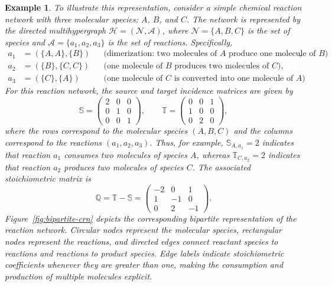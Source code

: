 \documentclass[a4paper,11pt,reqno]{amsart}
\newtheorem{example}[definition]{Example}
\begin{document}
\begin{example}
To illustrate this representation, consider a simple chemical reaction network
with three molecular species:
$A$, $B$, and $C$. The network is represented by the directed multihypergraph
$\mathcal{H}=(\mathcal{N},\mathcal{A})$, where
$\mathcal{N}=\{A,B,C\}$ is the set of species and
$\mathcal{A}=\{a_1,a_2,a_3\}$ is the set of reactions. Specifically,
\begin{align*}
a_1 &= (\{A,A\},\{B\})
&& \text{(dimerization: two molecules of $A$ produce one molecule of $B$)},\\
a_2 &= (\{B\},\{C,C\})
&& \text{(one molecule of $B$ produces two molecules of $C$)},\\
a_3 &= (\{C\},\{A\})
&& \text{(one molecule of $C$ is converted into one molecule of $A$)}.
\end{align*}
For this reaction network, the source and target incidence matrices are
given by
$$
\mathbb{S}=
\begin{pmatrix}
2 & 0 & 0\\
0 & 1 & 0\\
0 & 0 & 1
\end{pmatrix},
\qquad
\mathbb{T}=
\begin{pmatrix}
0 & 0 & 1\\
1 & 0 & 0\\
0 & 2 & 0
\end{pmatrix},
$$
where the rows correspond to the molecular species
$(A,B,C)$ and the columns correspond to the reactions
$(a_1,a_2,a_3)$. Thus, for example,
$\mathbb{S}_{A,a_1}=2$ indicates that reaction $a_1$ consumes two molecules of
species $A$, whereas $\mathbb{T}_{C,a_2}=2$ indicates that reaction $a_2$
produces two molecules of species $C$. The associated stoichiometric matrix is
$$
\mathbb{Q}=\mathbb{T}-\mathbb{S}=
\begin{pmatrix}
-2 & 0 & 1\\
1 & -1 & 0\\
0 & 2 & -1
\end{pmatrix}.
$$  
Figure~\ref{fig:bipartite-crn} depicts the corresponding bipartite
representation of the reaction network. Circular nodes represent the
molecular species, rectangular nodes represent the reactions, and directed
edges connect reactant species to reactions and reactions to product
species. Edge labels indicate stoichiometric coefficients whenever they are
greater than one, making the consumption and production of multiple
molecules explicit.
\begin{figure}[ht]
\centering
\begin{tikzpicture}[
    >=Latex,
    species/.style={
        circle,
        draw,
        thick,
        minimum size=8mm,
        inner sep=1pt,
        fill=blue!8
    },
    reaction/.style={
        rectangle,
        draw,
        thick,
        minimum width=8mm,
        minimum height=7mm,
        fill=orange!15
    },
    edge/.style={
        ->,
        thick
    },
    coeff/.style={
        font=\small,
        fill=white,
        inner sep=1pt
    },
    node distance=.5cm and 2cm
]


\end{tikzpicture}
\end{figure}
\end{example}
\end{document}

